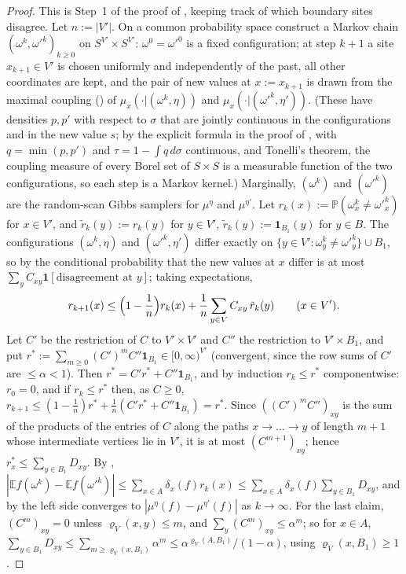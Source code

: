 \documentclass[11pt,a4paper]{article}
\theoremstyle{definition}
\theoremstyle{remark}
\newcommand{\E}{\mathbb{E}}
\newcommand{\Flab}[2]{\cite[#1 \texttt{#2}]{F}}
\begin{document}
\begin{proof}
This is Step~1 of the proof of \Flab{Theorem}{thm:dobrushin}, keeping track of which boundary sites disagree. Let $n:=|V'|$.
On a common probability space construct a Markov chain $(\omega^k,\omega'^k)_{k\ge0}$ on $S^{V'}\times S^{V'}$: $\omega^0=\omega'^0$
is a fixed configuration; at step $k+1$ a site $x_{k+1}\in V'$ is chosen uniformly and independently of the past, all other
coordinates are kept, and the pair of new values at $x:=x_{k+1}$ is drawn from the maximal coupling
(\Flab{Lemma}{lem:coupling}) of $\mu_x(\cdot|(\omega^k,\eta))$ and $\mu_x(\cdot|(\omega'^k,\eta'))$. (These have densities $p,p'$ with
respect to $\sigma$ that are jointly continuous in the configurations and in the new value $s$; by the explicit formula in the proof
of \Flab{Lemma}{lem:coupling}, with $q=\min(p,p')$ and $\tau=1-\int q\,d\sigma$ continuous, and Tonelli's theorem, the coupling
measure of every Borel set of $S\times S$ is a measurable function of the two configurations, so each step is a Markov kernel.) Marginally, $(\omega^k)$ and $(\omega'^k)$ are the random-scan Gibbs samplers for $\mu^\eta$ and
$\mu^{\eta'}$. Let $r_k(x):=\mathbb P(\omega^k_x\neq\omega'^k_x)$ for $x\in V'$, and $\tilde r_k(y):=r_k(y)$ for $y\in V'$,
$\tilde r_k(y):=\mathbf 1_{B_1}(y)$ for $y\in B$. The configurations $(\omega^k,\eta)$ and $(\omega'^k,\eta')$ differ exactly on
$\{y\in V':\omega^k_y\neq\omega'^k_y\}\cup B_1$, so by \Flab{eq.}{eq:interp} the conditional probability that the new values at
$x$ differ is at most $\sum_yC_{xy}\mathbf 1[\text{disagreement at }y]$; taking expectations,
\[
r_{k+1}(x)\le\Bigl(1-\frac1n\Bigr)r_k(x)+\frac1n\sum_{y\in V}C_{xy}\,\tilde r_k(y)\qquad(x\in V').
\]
Let $C'$ be the restriction of $C$ to $V'\times V'$ and $C''$ the restriction to $V'\times B_1$, and put
$r^*:=\sum_{m\ge0}(C')^mC''\mathbf 1_{B_1}\in[0,\infty)^{V'}$ (convergent, since the row sums of $C'$ are $\le\alpha<1$). Then
$r^*=C'r^*+C''\mathbf 1_{B_1}$, and by induction $r_k\le r^*$ componentwise: $r_0=0$, and if $r_k\le r^*$ then, as $C\ge0$,
$r_{k+1}\le(1-\frac1n)r^*+\frac1n(C'r^*+C''\mathbf 1_{B_1})=r^*$. Since $((C')^mC'')_{xy}$ is the sum of the products of the
entries of $C$ along the paths $x\to\dots\to y$ of length $m+1$ whose intermediate vertices lie in $V'$, it is at most
$(C^{m+1})_{xy}$; hence $r^*_x\le\sum_{y\in B_1}D_{xy}$. By \Flab{eq.}{eq:interp},
$|\E f(\omega^k)-\E f(\omega'^k)|\le\sum_{x\in A}\delta_x(f)r_k(x)\le\sum_{x\in A}\delta_x(f)\sum_{y\in B_1}D_{xy}$, and by
\Flab{Lemma}{lem:ergodic} the left side converges to $|\mu^\eta(f)-\mu^{\eta'}(f)|$ as $k\to\infty$. For the last claim,
$(C^m)_{xy}=0$ unless $\varrho_V(x,y)\le m$, and $\sum_y(C^m)_{xy}\le\alpha^m$; so for $x\in A$,
$\sum_{y\in B_1}D_{xy}\le\sum_{m\ge\varrho_V(x,B_1)}\alpha^m\le\alpha^{\varrho_V(A,B_1)}/(1-\alpha)$, using $\varrho_V(x,B_1)\ge1$.
\end{proof}
\end{document}
